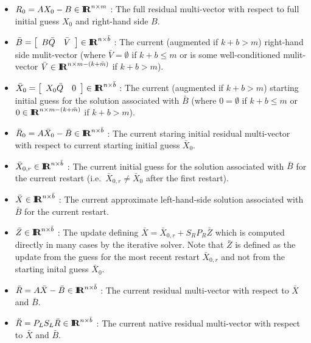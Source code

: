 \documentclass[pdf,ps2pdf,11pt]{SANDreport}
\begin{document}
\begin{itemize}

{}\item $R_0 = A X_0 - B {}\in\RE^{n
{}\times m}$ : The full residual multi-vector with respect to
full initial guess $X_0$ and right-hand side $B$.

{}\item $\bar{B}={\bmat{cc} B \bar{Q} & \bar{V} \emat}\in\RE^{n
{}\times \bar{b}}$ : The current (augmented if $k+b > m$)
right-hand side mulit-vector (where $\bar{V}=\emptyset$ if $k+b {}\leq
m$ or is some well-conditioned mulit-vector $\bar{V}\in\RE^{n {}\times
m-(k+\bar{m})}$ if $k+b > m$).

{}\item $\bar{X}_0={\bmat{cc} X_0 \bar{Q} & 0 \emat}\in\RE^{n {}\times
{}\bar{b}}$ : The current (augmented if $k+b > m$) starting initial
guess for the solution associated with $\bar{B}$ (where $0=\emptyset$
if $k+b {}\leq m$ or $0\in\RE^{n {}\times m-(k+\bar{m})}$ if $k+b >
m$).

{}\item $\bar{R}_0 = A \bar{X}_0 - \bar{B} {}\in\RE^{n
{}\times {}\bar{b}}$ : The current staring initial residual
multi-vector with respect to current starting initial guess
$\bar{X}_0$.

{}\item $\bar{X}_{0,r}\in\RE^{n {}\times {}\bar{b}}$ : The current
initial guess for the solution associated with $\bar{B}$ for the
current restart (i.e.~$\bar{X}_{0,r} {}\neq \bar{X}_0$ after the first
restart).

{}\item $\bar{X}\in\RE^{n {}\times {}\bar{b}}$ : The current
approximate left-hand-side solution associated with $\bar{B}$ for the
current restart.

{}\item $\bar{Z}\in\RE^{n {}\times {}\bar{b}}$ : The update defining
$\bar{X} = \bar{X}_{0,r} + S_R P_R \bar{Z}$ which is computed directly
in many cases by the iterative solver.  Note that $\bar{Z}$ is defined
as the update from the guess for the most recent restart
$\bar{X}_{0,r}$ and not from the starting inital guess $\bar{X}_0$.

{}\item $\bar{R} = A \bar{X} - \bar{B} {}\in\RE^{n {}\times
{}\bar{b}}$ : The current residual multi-vector with respect to
$\bar{X}$ and $\bar{B}$.

{}\item $\breve{R} = P_L S_L \bar{R} {}\in\RE^{n {}\times {}\bar{b}}$
: The current native residual multi-vector with respect to $\bar{X}$
and $\bar{B}$.

\end{itemize}
\end{document}
